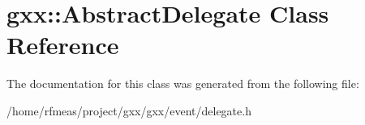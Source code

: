 \hypertarget{classgxx_1_1AbstractDelegate}{}\section{gxx\+:\+:Abstract\+Delegate Class Reference}
\label{classgxx_1_1AbstractDelegate}


The documentation for this class was generated from the following file\+:\begin{DoxyCompactItemize}
\item 
/home/rfmeas/project/gxx/gxx/event/delegate.\+h\end{DoxyCompactItemize}
